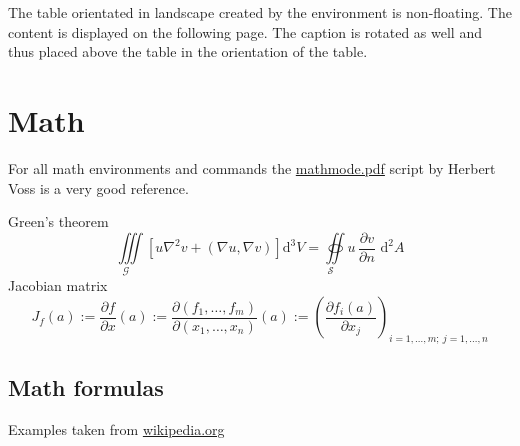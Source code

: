 The table orientated in landscape created by the environment  is non-floating. The content is displayed on the following page. The caption is rotated as well and thus placed above the table in the orientation of the table.

%

%
\clearpage
\section{Math}

For all math environments and commands the \url{mathmode.pdf} script by Herbert Voss is a very good reference.

\begin{filecontents*}{\democodefile}
Green's theorem
\begin{equation}
  \underset{\mathcal{G}\quad}\iiint
  \left[u\nabla^{2}v+\left(\nabla  u,\nabla  v\right)\right]\mathrm{d}^{3}V
  =\underset{\mathcal{S}\quad}\oiint  u\,\frac{\partial v}{\partial n}
  \,\,\mathrm{d}^{2}A
\end{equation}
Jacobian matrix
\begin{equation}
  J_f(a) := \frac{\partial {f}}{\partial {x}}(a) 
         := \frac{\partial(f_1,  \ldots, f_m)}{\partial(x_1, \ldots, x_n)}(a)
         := \left(\frac{\partial f_i(a)}{\partial x_j}\right)_{i=1,\ldots,m;\
             j=1,\ldots,n}
\end{equation}
\end{filecontents*}

\subsection{Math formulas}
\label{sec:mathformulars}

Examples taken from \url{wikipedia.org}

%


